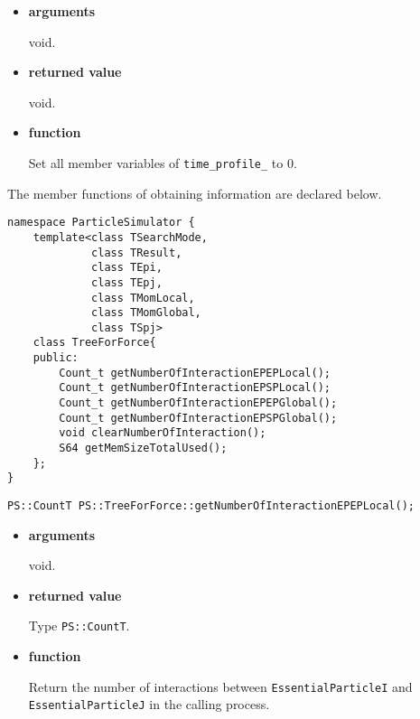 \begin{itemize}

\item {\bf arguments}

void.

\item {\bf returned value}

void.

\item {\bf function}

Set all member variables of {\tt time\_profile\_} to 0.

\end{itemize}


The member functions of obtaining information are declared
below. 

\begin{lstlisting}[caption=TreeForForce2]
namespace ParticleSimulator {
    template<class TSearchMode,
             class TResult,
             class TEpi,
             class TEpj,
             class TMomLocal,
             class TMomGlobal,
             class TSpj>
    class TreeForForce{
    public:
        Count_t getNumberOfInteractionEPEPLocal();
        Count_t getNumberOfInteractionEPSPLocal();
        Count_t getNumberOfInteractionEPEPGlobal();
        Count_t getNumberOfInteractionEPSPGlobal();
        void clearNumberOfInteraction();
        S64 getMemSizeTotalUsed();
    };
}
\end{lstlisting}


\begin{screen}
\begin{verbatim}
PS::CountT PS::TreeForForce::getNumberOfInteractionEPEPLocal();
\end{verbatim}
\end{screen}

\begin{itemize}

\item {\bf arguments}

void.

\item {\bf returned value}

Type {\tt PS::CountT}.

\item {\bf function}

Return the number of interactions between {\tt EssentialParticleI} and
{\tt EssentialParticleJ} in the calling process.


\end{itemize}

